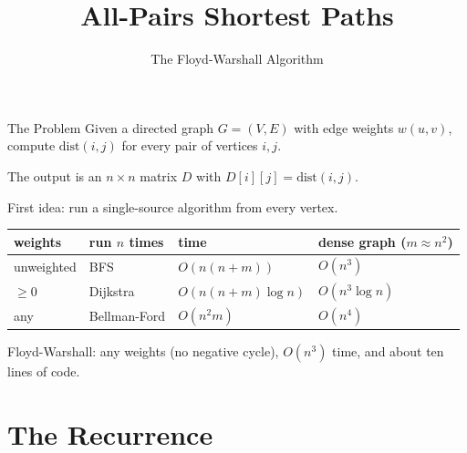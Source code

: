 \documentclass[10pt,aspectratio=169,xcolor=table]{beamer}
\title{All-Pairs Shortest Paths}
\subtitle{The Floyd-Warshall Algorithm}
\date{}
\author{}
\begin{document}
\maketitle

\begin{frame}{The Problem}
  Given a directed graph $G = (V, E)$ with edge weights $w(u, v)$, compute
  $\text{dist}(i, j)$ for \alert{every} pair of vertices $i, j$.

  \medskip
  The output is an $n \times n$ matrix $D$ with $D[i][j] = \text{dist}(i, j)$.

  \pause
  \bigskip
  First idea: run a single-source algorithm from every vertex.

  \medskip
  \begin{center}
  \begin{tabular}{llll}
    \toprule
    weights & run $n$ times & time & dense graph ($m \approx n^2$) \\
    \midrule
    unweighted & BFS & $O(n(n + m))$ & $O(n^3)$ \\
    $\ge 0$ & Dijkstra & $O(n(n + m) \log n)$ & $O(n^3 \log n)$ \\
    any & Bellman-Ford & $O(n^2 m)$ & $O(n^4)$ \\
    \bottomrule
  \end{tabular}
  \end{center}

  \pause
  \bigskip
  \alert{Floyd-Warshall}: any weights (no negative cycle), $O(n^3)$ time,
  and about ten lines of code.
\end{frame}

\section{The Recurrence}
\end{document}
